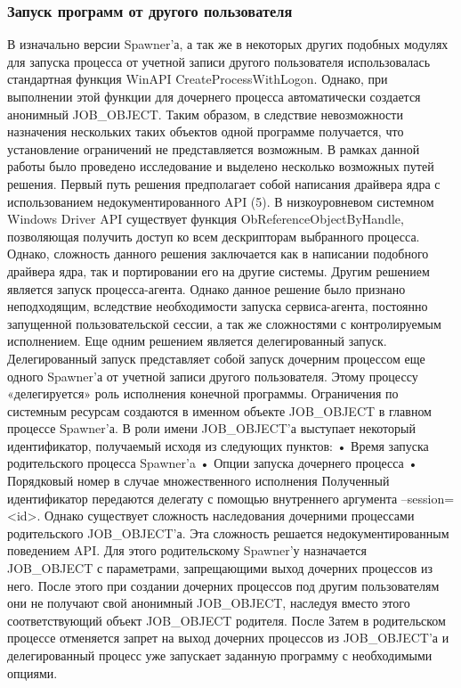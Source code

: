 \documentclass{imcs}
\begin{document}
\subsubsection{Запуск программ от другого пользователя}
В изначально версии Spawner'а, а так же в некоторых других подобных модулях для запуска процесса от учетной записи другого пользователя использовалась стандартная функция WinAPI CreateProcessWithLogon. Однако, при выполнении этой функции для дочернего процесса автоматически создается анонимный JOB\_OBJECT. Таким образом, в следствие невозможности назначения нескольких таких объектов одной программе получается, что установление ограничений не представляется возможным. В рамках данной работы было проведено исследование и выделено несколько возможных путей решения.
Первый путь решения предполагает собой написания драйвера ядра с использованием недокументированного API (5). В низкоуровневом системном Windows Driver API существует функция ObReferenceObjectByHandle, позволяющая получить доступ ко всем дескрипторам выбранного процесса. Однако, сложность данного решения заключается как в написании подобного драйвера ядра, так и портировании его на другие системы.
Другим решением является запуск процесса-агента. Однако данное решение было признано неподходящим, вследствие необходимости запуска сервиса-агента, постоянно запущенной пользовательской сессии, а так же сложностями с контролируемым исполнением.
Еще одним решением является делегированный запуск. Делегированный запуск представляет собой запуск дочерним процессом еще одного Spawner'а от учетной записи другого пользователя. Этому процессу «делегируется» роль исполнения конечной программы. Ограничения по системным ресурсам создаются в именном объекте JOB\_OBJECT в главном процессе Spawner'а. В роли имени JOB\_OBJECT'а выступает некоторый идентификатор, получаемый исходя из следующих пунктов:
•	Время запуска родительского процесса Spawner'a
•	Опции запуска дочернего процесса
•	Порядковый номер в случае множественного исполнения
Полученный идентификатор передаются делегату с помощью внутреннего аргумента --session=<id>.
Однако существует сложность наследования дочерними процессами родительского JOB\_OBJECT'а. Эта сложность решается недокументированным поведением API. Для этого родительскому Spawner'у назначается JOB\_OBJECT с параметрами, запрещающими выход дочерних процессов из него. После этого при создании дочерних процессов под другим пользователям они не получают свой анонимный JOB\_OBJECT, наследуя вместо этого соответствующий объект JOB\_OBJECT родителя. После Затем в родительском процессе отменяется запрет на выход дочерних процессов из JOB\_OBJECT'а и делегированный процесс уже запускает заданную программу с необходимыми опциями.
\end{document}
